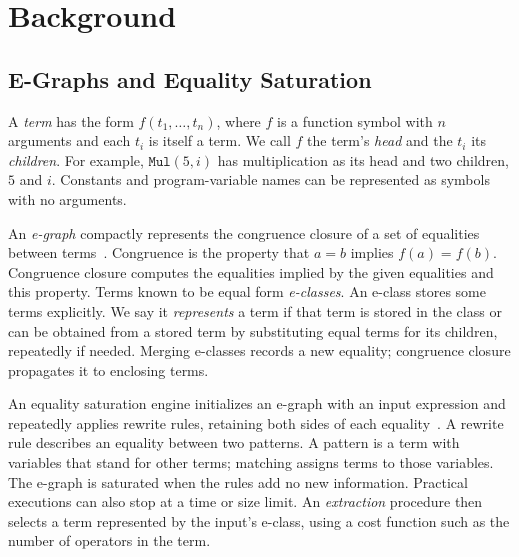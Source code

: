 \section{Background}
\label{sec:background}
\label{sec:related-work}


\subsection{E-Graphs and Equality Saturation}
\label{sec:background-egraphs}

A \emph{term} has the form $f(t_1,\ldots,t_n)$,
  where $f$ is a function symbol with $n$ arguments and each $t_i$ is itself a term.
We call $f$ the term's \emph{head} and the $t_i$ its \emph{children}.
For example, $\mathtt{Mul}(5,i)$ has multiplication as its head and two children, $5$ and $i$.
Constants and program-variable names can be represented as symbols with no arguments.

An \emph{e-graph} compactly represents the congruence closure
  of a set of equalities between terms~\cite{nelson,eggcc}.
Congruence is the property that $a=b$ implies $f(a)=f(b)$.
Congruence closure computes the equalities implied by the given equalities and this property.
Terms known to be equal form \emph{e-classes}.
An e-class stores some terms explicitly.
We say it \emph{represents} a term if that term is stored in the class
  or can be obtained from a stored term by substituting equal terms for its children,
  repeatedly if needed.
Merging e-classes records a new equality;
  congruence closure propagates it to enclosing terms.

An equality saturation engine initializes an e-graph with an input expression
  and repeatedly applies rewrite rules, retaining both sides of each equality~\cite{peggy,egg}.
A rewrite rule describes an equality between two patterns.
A pattern is a term with variables that stand for other terms;
  matching assigns terms to those variables.
The e-graph is saturated when the rules add no new information.
Practical executions can also stop at a time or size limit.
An \emph{extraction} procedure then selects a term represented by the input's e-class,
  using a cost function such as the number of operators in the term.

